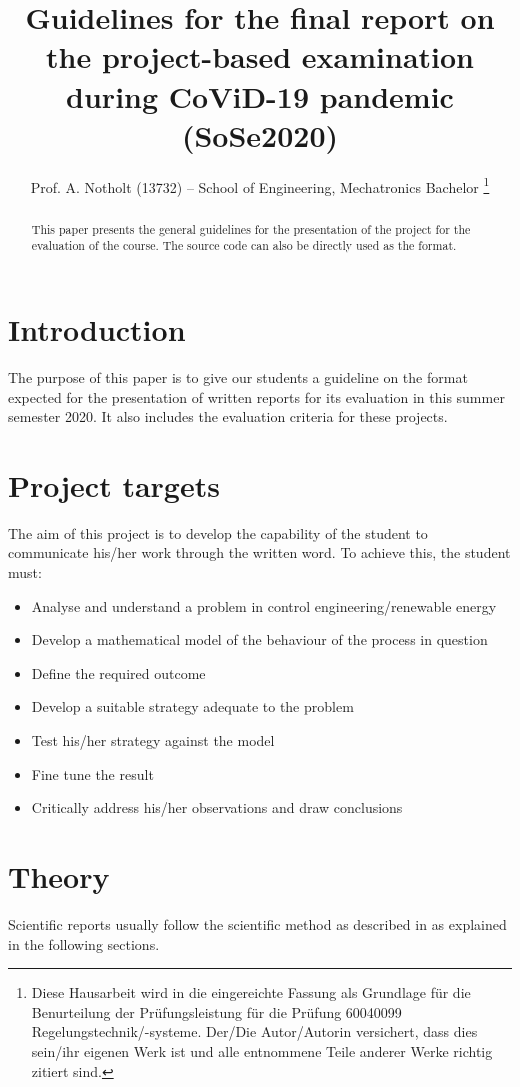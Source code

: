 \documentclass[a4paper, 10pt]{IEEEtran}
\title{Guidelines for the final report on the project-based examination during CoViD-19 pandemic (SoSe2020)}%
\author{Prof. A. Notholt (13732)%
			-- School of Engineering, Mechatronics Bachelor %
			\thanks{Diese Hausarbeit wird in die eingereichte Fassung als Grundlage für die Benurteilung 
		            der Prüfungsleistung für die Prüfung
	            	60040099 %
	            	Regelungstechnik/-systeme. %
            	 	Der/Die Autor/Autorin versichert, dass dies sein/ihr eigenen Werk ist und alle entnommene Teile anderer Werke richtig zitiert sind.
             		}}
\begin{document}
	
	\maketitle
	
	\begin{abstract} %
		This paper presents the general guidelines for the presentation of the project for the evaluation of the course. The source code can also be directly used as the format.
	\end{abstract}
	
	\section{Introduction}
	
	The purpose of this paper is to give our students a guideline on the format expected for the presentation of written reports for its evaluation in this summer semester 2020. It also includes the evaluation criteria for these projects.
	
	\section{Project targets}
	
	The aim of this project is to develop the capability of the student to communicate his/her work through the written word. To achieve this, the student must:
	
	\begin{itemize}
		\item Analyse and understand a problem in control engineering/renewable energy
		\item Develop a mathematical model of the behaviour of the process in question
		\item Define the required outcome
		\item Develop a suitable strategy adequate to the problem
		\item Test his/her strategy against the model
		\item Fine tune the result
		\item Critically address his/her observations and draw conclusions
	\end{itemize}
	
	\section{Theory}
	
	Scientific reports usually follow the scientific method as described in \cite{scientificMethod} as explained in the following sections.
	
\end{document}
